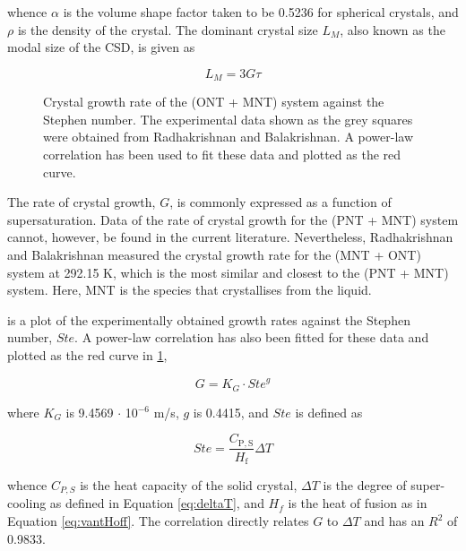 \noindent whence $\alpha$ is the volume shape factor taken to be 0.5236 for spherical crystals, and $\rho$ is the density of the crystal. The dominant crystal size $L_M$, also known as the modal size of the CSD, is given as 

\begin{equation} \label{eq:LM G tau}
    L_M = 3 G \tau
\end{equation}

\begin{figure}
    
    \caption{Crystal growth rate of the (ONT + MNT) system against the Stephen number. The experimental data shown as the grey squares were obtained from Radhakrishnan and Balakrishnan. \cite{radhakrishnan_kinetics_1999} A power-law correlation has been used to fit these data and plotted as the red curve.}
    \label{fig:ONT + MNT kinetics}
\end{figure}

The rate of crystal growth, $G$, is commonly expressed as a function of supersaturation. Data of the rate of crystal growth for the (PNT + MNT) system cannot, however, be found in the current literature. Nevertheless, Radhakrishnan and Balakrishnan measured the crystal growth rate for the (MNT + ONT) system at 292.15 K, which is the most similar and closest to the (PNT + MNT) system. \cite{radhakrishnan_kinetics_1999} Here, MNT is the species that crystallises from the liquid.

 is a plot of the experimentally obtained growth rates against the Stephen number, $Ste$. A power-law correlation has also been fitted for these data and plotted as the red curve in \cref{fig:ONT + MNT kinetics},

\begin{equation}  \label{eq:KG Ste g}
    G = K_G \cdot {Ste}^{g}
\end{equation}

\noindent where $K_G$ is 9.4569 $\cdot$ 10$^{-6}$ m/s, $g$ is 0.4415, and $Ste$ is defined as 

\begin{equation}
    Ste = \frac{C_{\mathrm{P,S}}}{H_{\mathrm{f}}} \Delta T
\end{equation}

\noindent whence $C_{P,S}$ is the heat capacity of the solid crystal, $\Delta T$ is the degree of super-cooling as defined in Equation \ref{eq:deltaT}, and $H_{f}$ is the heat of fusion as in Equation \ref{eq:vantHoff}. The correlation directly relates $G$ to $\Delta T$ and has an $R^2$ of 0.9833.

